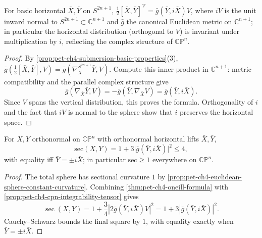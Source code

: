 \begin{proposition}
  \label{prop:pet-ch4-cpn-integrability-tensor}

  For basic horizontal $\bar X,\bar Y$ on $S^{2n+1}$, $\tfrac12[\bar X,\bar Y]^{\mathcal V}=\bar g(\bar Y,i\bar X)V$,
  where $iV$ is the unit inward normal to $S^{2n+1}\subset\mathbb{C}^{n+1}$ and
  $\bar g$ the canonical Euclidean metric on $\mathbb{C}^{n+1}$; in particular the
  horizontal distribution (orthogonal to $V$) is invariant under
  multiplication by $i$, reflecting the complex structure of $\mathbb{CP}^n$.
\end{proposition}
\begin{proof}
  \sketch
  By \cref{prop:pet-ch4-submersion-basic-properties}(3),
  $\bar g(\tfrac12[\bar X,\bar Y],V)
  =\bar g(\nabla^{S^{2n+1}}_{\bar X}\bar Y,V)$. Compute this inner product in
  $\mathbb C^{n+1}$: metric compatibility and the parallel complex structure
  give
  \[
    \bar g(\nabla_{\bar X}\bar Y,V)
    =-\bar g(\bar Y,\nabla_{\bar X}V)
    =\bar g(\bar Y,i\bar X).
  \]
  Since $V$ spans the vertical distribution, this proves the formula. Orthogonality
  of $i$ and the fact that $iV$ is normal to the sphere show that $i$ preserves
  the horizontal space.
\end{proof}


\begin{theorem}
  \label{thm:pet-ch4-cpn-sectional-curvature}

  For $X,Y$ orthonormal on $\mathbb{CP}^n$ with orthonormal horizontal lifts
  $\bar X,\bar Y$,
  \[
    \mathrm{sec}(X,Y)=1+3\big|\bar g(\bar Y,i\bar X)\big|^2\le4,
  \]
  with equality iff $\bar Y=\pm i\bar X$; in particular $\mathrm{sec}\ge1$
  everywhere on $\mathbb{CP}^n$.
\end{theorem}
\begin{proof}
  \sketch
  The total sphere has sectional curvature $1$ by
  \cref{prop:pet-ch4-euclidean-sphere-constant-curvature}. Combining
  \cref{thm:pet-ch4-oneill-formula} with
  \cref{prop:pet-ch4-cpn-integrability-tensor} gives
  \[
    \operatorname{sec}(X,Y)
    =1+\frac34\left|2\bar g(\bar Y,i\bar X)V\right|^2
    =1+3|\bar g(\bar Y,i\bar X)|^2.
  \]
  Cauchy--Schwarz bounds the final square by $1$, with equality exactly when
  $\bar Y=\pm i\bar X$.
\end{proof}

